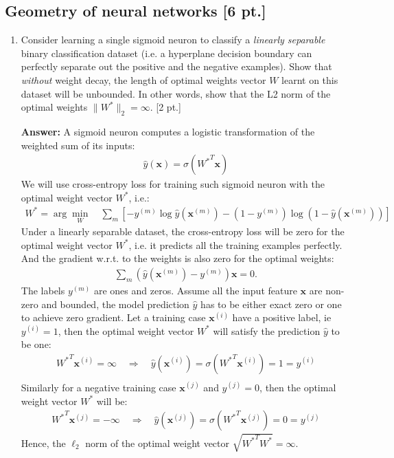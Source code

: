 \documentclass[12pt,letterpaper]{article}
\begin{document}
\subsection{Geometry of neural networks [6 pt.]}
\begin{enumerate}
\item Consider learning a single sigmoid neuron to classify a \textit{linearly separable} binary classification dataset (i.e. a hyperplane decision boundary can perfectly separate out the positive and the negative examples). Show that \textit{without} weight decay, the length of optimal weights vector $W$ learnt on this dataset will be unbounded. In other words, show that the L2 norm of the optimal weights $\|W^* \|_2 = \infty$.  [2 pt.]

  {\color{red} 
\textbf{Answer: }
A sigmoid neuron computes a logistic transformation of the weighted sum of its inputs:
\begin{align*}
  \hat{y}(\mathbf{x}) = \sigma({W^*}^T\mathbf{x})
\end{align*}
We will use cross-entropy loss for training such sigmoid neuron with the optimal weight vector  $W^*$, i.e.:
\begin{align*}
  W^* = \arg\min_W \quad \sum_m [- y^{(m)}\log\hat{y}(\mathbf{x}^{(m)}) - (1-y^{(m)}) \log(1-\hat{y}(\mathbf{x}^{(m)}))]
\end{align*}
Under a linearly separable dataset, the cross-entropy loss will be zero for the optimal weight vector $W^*$, i.e. it predicts all the training examples perfectly. And the gradient w.r.t. to the weights is also zero for the optimal weights:
\begin{align*}
  \sum_m (\hat{y}(\mathbf{x}^{(m)}) - y^{(m)})\mathbf{x} = 0.
\end{align*}
The labels $y^{(m)}$ are ones and zeros. Assume all the input feature $\mathbf{x}$ are non-zero and bounded, the model prediction $\hat{y}$ has to be either exact zero or one to achieve zero gradient. Let a training case $\mathbf{x}^{(i)}$ have a positive label, ie $y^{(i)}= 1$, then the optimal weight vector $W^*$ will satisfy the prediction $\hat{y}$ to be one:  
\begin{align*}
  {W^*}^T\mathbf{x}^{(i)} = \infty \quad \Rightarrow \quad \hat{y}(\mathbf{x}^{(i)}) = \sigma({W^*}^T\mathbf{x}^{(i)}) = 1 = y^{(i)}\\
\end{align*}
Similarly for a negative training case $\mathbf{x}^{(j)}$ and $y^{(j)}= 0$, then the optimal weight vector $W^*$ will be:
\begin{align*}
  {W^*}^T\mathbf{x}^{(j)} = -\infty \quad \Rightarrow \quad \hat{y}(\mathbf{x}^{(j)}) = \sigma({W^*}^T\mathbf{x}^{(j)}) = 0 = y^{(j)}
\end{align*}
Hence, the $\ell_2$ norm of the optimal weight vector $\sqrt{{W^*}^T{W^*}} = \infty$. 
}


\end{enumerate}
\end{document}
